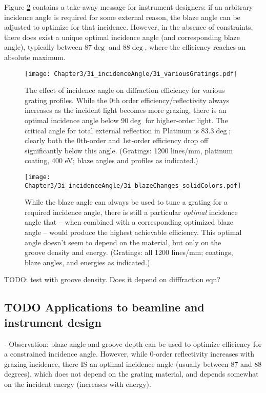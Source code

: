 Figure \ref{3i-2} contains a take-away message for instrument designers: if an arbitrary incidence angle is required for some external reason, the blaze angle can be adjusted to optimize for that incidence. However, in the absence of constraints, there does exist a unique optimal incidence angle (and corresponding blaze angle), typically between $87\deg$ and $88\deg$, where the efficiency reaches an absolute maximum.


\begin{figure}[htbp] %
   \centering
   \texttt{[image: Chapter3/3i\_incidenceAngle/3i\_variousGratings.pdf]} 
   \caption{The effect of incidence angle on diffraction efficiency for various grating profiles.  While the 0th order efficiency/reflectivity always increases as the incident light becomes more grazing, there is an optimal incidence angle below 90$\deg$ for higher-order light.  The critical angle for total external reflection in Platinum is 83.3$\deg$; clearly both the 0th-order and 1st-order efficiency drop off significantly below this angle. (Gratings: 1200 lines/mm, platinum coating, 400 eV; blaze angles and profiles as indicated.)}
   \label{3i}
\end{figure}
	
\begin{figure}[htbp] %
   \centering
   \texttt{[image: Chapter3/3i\_incidenceAngle/3i\_blazeChanges\_solidColors.pdf]} 
   \caption{While the blaze angle can always be used to tune a grating for a required incidence angle, there is still a particular \emph{optimal} incidence angle that -- when combined with a corresponding optimized blaze angle -- would produce the highest achievable efficiency.  This optimal angle doesn't seem to depend on the material, but only on the groove density and energy.  (Gratings: all 1200 lines/mm; coatings, blaze angles, and energies as indicated.)}
   \label{3i-2}
\end{figure}

TODO: test with groove density. Does it depend on difffraction eqn?
	
\subsection{TODO Applications to beamline and instrument design}
	- Observation: blaze angle and groove depth can be used to optimize efficiency for a constrained incidence angle.  However, while 0-order reflectivity increases with grazing incidence, there IS an optimal incidence angle (usually between 87 and 88 degrees), which does not depend on the grating material, and depends somewhat on the incident energy (increases with energy).  
	
